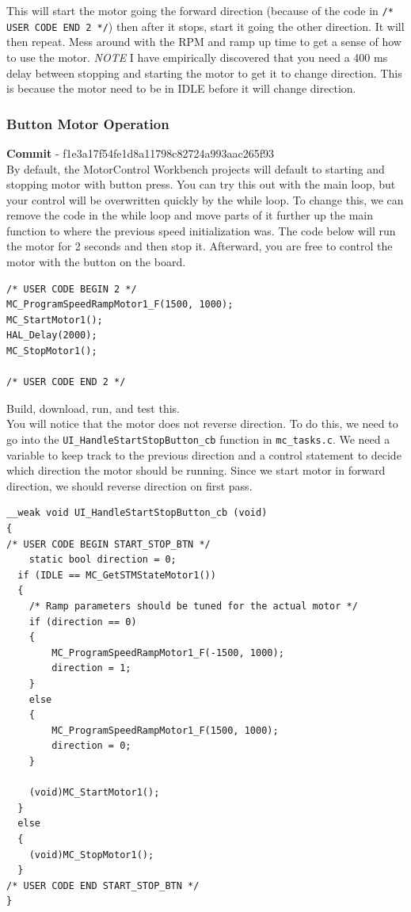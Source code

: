 \documentclass[10pt]{article}
\begin{document}
                This will start the motor going the forward direction (because of the code in \texttt{/* USER CODE END 2 */}) then after it stops, start it going the other direction. It will then repeat. Mess around with the RPM and ramp up time to get a sense of how to use the motor. \emph{NOTE} I have empirically discovered that you need a 400 ms delay between stopping and starting the motor to get it to change direction. This is because the motor need to be in IDLE before it will change direction.
			\FloatBarrier \subsubsection{Button Motor Operation}
                    \textbf{Commit} - f1e3a17f54fe1d8a11798c82724a993aac265f93 \\
                    By default, the MotorControl Workbench projects will default to starting and stopping motor with button press. You can try this out with the main loop, but your control will be overwritten quickly by the while loop. To change this, we can remove the code in the while loop and move parts of it further up the main function to where the previous speed initialization was. The code below will run the motor for 2 seconds and then stop it. Afterward, you are free to control the motor with the button on the board.
                    \begin{verbatim}
/* USER CODE BEGIN 2 */
MC_ProgramSpeedRampMotor1_F(1500, 1000);
MC_StartMotor1();
HAL_Delay(2000);
MC_StopMotor1();

/* USER CODE END 2 */
                    \end{verbatim}
                    Build, download, run, and test this. \\
                    You will notice that the motor does not reverse direction. To do this, we need to go into the \texttt{UI\_HandleStartStopButton\_cb} function in \texttt{mc\_tasks.c}. We need a variable to keep track to the previous direction and a control statement to decide which direction the motor should be running. Since we start motor in forward direction, we should reverse direction on first pass.
                    \begin{verbatim}
__weak void UI_HandleStartStopButton_cb (void)
{
/* USER CODE BEGIN START_STOP_BTN */
    static bool direction = 0;
  if (IDLE == MC_GetSTMStateMotor1())
  {
    /* Ramp parameters should be tuned for the actual motor */
    if (direction == 0)
    {
        MC_ProgramSpeedRampMotor1_F(-1500, 1000);
        direction = 1;
    }
    else
    {
        MC_ProgramSpeedRampMotor1_F(1500, 1000);
        direction = 0;
    }

    (void)MC_StartMotor1();
  }
  else
  {
    (void)MC_StopMotor1();
  }
/* USER CODE END START_STOP_BTN */
}
                    \end{verbatim}
\end{document}
